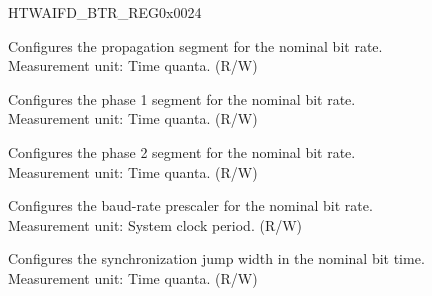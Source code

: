 \begin{register}{H}{TWAIFD\_BTR\_REG}{0x0024}\label{regdesc:TWAIFDBTRREG}
%
%
%
%
%
\regnewline%
\begin{regdesc}\begin{reglist}
\label{fielddesc:TWAIFDPROP}\item [TWAIFD\_PROP] Configures the propagation segment for the nominal bit rate.\\
Measurement unit: Time quanta. (R/W)
\label{fielddesc:TWAIFDPH1}\item [TWAIFD\_PH1] Configures the phase 1 segment for the nominal bit rate.\\
Measurement unit: Time quanta. (R/W)
\label{fielddesc:TWAIFDPH2}\item [TWAIFD\_PH2] Configures the phase 2 segment for the nominal bit rate.\\
Measurement unit: Time quanta. (R/W)
\label{fielddesc:TWAIFDBRP}\item [TWAIFD\_BRP] Configures the baud-rate prescaler for the nominal bit rate.\\
Measurement unit: System clock period. (R/W)
\label{fielddesc:TWAIFDSJW}\item [TWAIFD\_SJW] Configures the synchronization jump width in the nominal bit time.\\
Measurement unit: Time quanta. (R/W)
\end{reglist}\end{regdesc}
\end{register}


